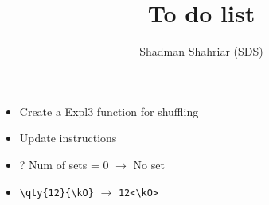 \documentclass{article}
\title{To do list}
\author{Shadman Shahriar (SDS)}
\begin{document}
\maketitle
\begin{itemize}
    \item Create a Expl3 function for shuffling
    \item Update instructions
    \item ? Num of sets = 0 $\to$ No set
    \item \verb|\qty{12}{\kO}| $\to$ \verb|12<\kO>|
\end{itemize}
\end{document}
